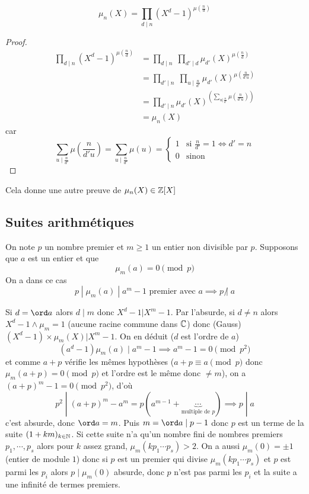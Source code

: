 \begin{res}
\[
    \mu_n(X)=\prod_{d\;|\;n}\left(X^d-1\right)^{\mu\left(\frac nd\right)}
\]
\end{res}

\begin{proof}
\begin{align*}
    \prod_{d\;|\; n}\left(X^d-1\right)^{\mu\left(\frac nd\right)}&=\prod_{d\;|\;n}\;\prod_{d'\;|\;d}\mu_{d'}(X)^{\mu\left(\frac nd\right)} \\
    &= \prod_{d'\;|\; n}\;\prod_{u\;|\;\frac n{d'}}\mu_{d'}(X)^{\mu\left(\frac n{d'u}\right)} \\
    &= \prod_{d'\;|\;n}\mu_{d'}(X)^{\left(\displaystyle\sum_{u|\frac n{d'}}\mu\left(\frac n{d'u}\right)\right)}\\
    &=\mu_n(X)
\end{align*}
car \[
\sum_{u\;|\;\frac n{d'}}\mu\left(\frac n{d'u}\right)=\sum_{u\;|\;\frac n{d'}}\mu(u)=\begin{cases}
    1& \text{si }\frac n{d'}=1\iff d'=n \\
    0& \text{sinon}
\end{cases}
\]
\end{proof}

\begin{rem}
Cela donne une autre preuve de $\mu_n(X)\in\mathbb Z[X]$
\end{rem}

\subsection{Suites arithmétiques}

On note $p$ un nombre premier et $m\geq 1$ un entier non divisible par $p$. Supposons que $a$ est un entier et que \[
    \mu_m(a)= 0\pmod p
\]
On a dans ce cas \[
    p\;|\;\mu_m(a)\;|\;a^m-1 \text{ premier avec }a \implies p\;\not|\;a
\]

Si $d=\ord a$ alors $d\;|\; m$ donc $X^d-1|X^m-1$. Par l'absurde, si $d\neq n$ alors $X^d-1\land \mu_m=1$ (aucune racine commune dans $\mathbb C$) donc (Gauss) $(X^d-1)\times \mu_m(X)|X^m-1$. On en déduit ($d$ est l'ordre de $a$) \[
    (a^d-1)\mu_m(a)\;|\;a^m-1 \implies a^m-1=0\pmod {p^2}
\]
et comme $a+p$ vérifie les mêmes hypothèses ($a+p\equiv a\pmod p$ donc $\mu_m(a+p)=0\pmod {p}$ et l'ordre est le même donc $\neq m$), on a $(a+p)^m-1= 0\pmod {p^2}$, d'où \[
    p^2\;|\; (a+p)^m-a^m=p\left(a^{m-1}+\underbrace{\cdots}_{\text{multiple de }p}\right) \implies p\;|\; a
\]
c'est absurde, donc $\ord a = m$. Puis $m=\ord a\;|\;p-1$ donc $p$ est un terme de la suite $(1+km)_{k\in\mathbb N}$. Si cette suite n'a qu'un nombre fini de nombres premiers $p_1, \cdots, p_s$ alors pour $k$ assez grand, $\mu_m(kp_1\cdots p_s)>2$. On a aussi $\mu_m(0)=\pm 1$ (entier de module $1$) donc si $p$ est un premier qui divise $\mu_m(kp_1\cdots p_s)$ et $p$ est parmi les $p_i$ alors $p\;|\; \mu_m(0)$ absurde, donc $p$ n'est pas parmi les $p_i$ et la suite a une infinité de termes premiers.

